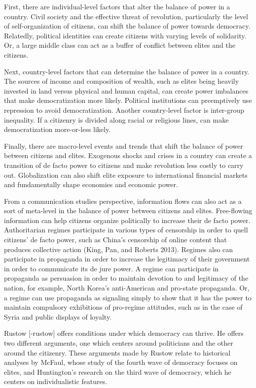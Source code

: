 \documentclass[12pt,]{article}
\begin{document}
First, there are individual-level factors that alter the balance of
power in a country. Civil society and the effective threat of
revolution, particularly the level of self-organization of citizens, can
shift the balance of power towards democracy. Relatedly, political
identities can create citizens with varying levels of solidarity. Or, a
large middle class can act as a buffer of conflict between elites and
the citizens.

Next, country-level factors that can determine the balance of power in a
country. The sources of income and composition of wealth, such as elites
being heavily invested in land versus physical and human capital, can
create power imbalances that make democratization more likely. Political
institutions can preemptively use repression to avoid democratization.
Another country-level factor is inter-group inequality. If a citizenry
is divided along racial or religious lines, can make democratization
more-or-less likely.

Finally, there are macro-level events and trends that shift the balance
of power between citizens and elites. Exogenous shocks and crises in a
country can create a transition of de facto power to citizens and make
revolution less costly to carry out. Globalization can also shift elite
exposure to international financial markets and fundamentally shape
economies and economic power.

From a communication studies perspective, information flows can also act
as a sort of meta-level in the balance of power between citizens and
elites. Free-flowing information can help citizens organize politically
to increase their de facto power. Authoritarian regimes participate in
various types of censorship in order to quell citizens' de facto power,
such as China's censorship of online content that produces collective
action (King, Pan, and Roberts 2013). Regimes also can participate in
propaganda in order to increase the legitimacy of their government in
order to communicate its de jure power. A regime can participate in
propaganda as persuasion in order to maintain devotion to and legitimacy
of the nation, for example, North Korea's anti-American and pro-state
propaganda. Or, a regime can use propaganda as signaling simply to show
that it has the power to maintain compulsory exhibitions of pro-regime
attitudes, such as in the case of Syria and public displays of loyalty.

Rustow {[}-rustow{]} offers conditions under which democracy can thrive.
He offers two different arguments, one which centers around politicians
and the other around the citizenry. These arguments made by Rustow
relate to historical analyses by McFaul, whose study of the fourth wave
of democracy focuses on elites, and Huntington's research on the third
wave of democracy, which he centers on individualistic features.
\end{document}
